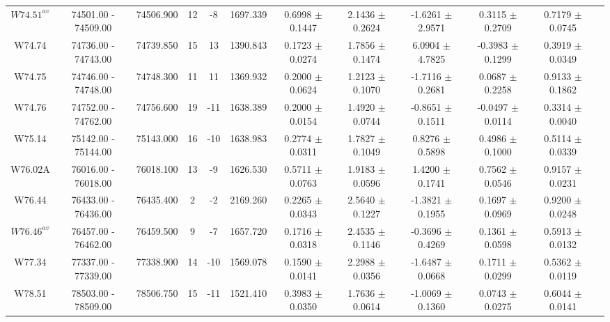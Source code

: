 \documentclass{article}
\begin{document}
\begin{table}[h]
{\begin{tabular}{|c|c|c|c|c|c|c|c|c|c|c|c|}
$W74.51^{av}$ & 74501.00 - 74509.00 & 74506.900 & 12 & -8 & 1697.339 & 0.6998 $\pm$ 0.1447 & 2.1436 $\pm$ 0.2624 & -1.6261 $\pm$ 2.9571 & 0.3115 $\pm$ 0.2709 & 0.7179 $\pm$ 0.0745 \\

W74.74 & 74736.00 - 74743.00 & 74739.850 & 15 & 13 & 1390.843 & 0.1723 $\pm$ 0.0274 & 1.7856 $\pm$ 0.1474 &  6.0904 $\pm$ 4.7825 & -0.3983 $\pm$ 0.1299 & 0.3919 $\pm$ 0.0349 \\

W74.75 & 74746.00 - 74748.00 & 74748.300 & 11 & 11 & 1369.932 & 0.2000 $\pm$ 0.0624 & 1.2123 $\pm$ 0.1070 & -1.7116 $\pm$ 0.2681 & 0.0687 $\pm$ 0.2258 & 0.9133 $\pm$ 0.1862 \\

W74.76 & 74752.00 - 74762.00 & 74756.600 & 19 & -11 & 1638.389 & 0.2000 $\pm$ 0.0154 & 1.4920 $\pm$ 0.0744 & -0.8651 $\pm$ 0.1511 & -0.0497 $\pm$ 0.0114 & 0.3314 $\pm$ 0.0040 \\
         
W75.14 & 75142.00 - 75144.00 & 75143.000 & 16 & -10 & 1638.983 & 0.2774 $\pm$ 0.0311 & 1.7827 $\pm$ 0.1049 &  0.8276 $\pm$ 0.5898 & 0.4986 $\pm$ 0.1000 & 0.5114 $\pm$ 0.0339 \\

W76.02A & 76016.00 - 76018.00 & 76018.100 & 13 & -9 & 1626.530 & 0.5711 $\pm$ 0.0763 & 1.9183 $\pm$ 0.0596 & 1.4200 $\pm$ 0.1741 & 0.7562 $\pm$ 0.0546 & 0.9157 $\pm$ 0.0231 \\

W76.44 & 76433.00 - 76436.00 & 76435.400 & 2 & -2 & 2169.260 & 0.2265 $\pm$ 0.0343 & 2.5640 $\pm$ 0.1227 & -1.3821 $\pm$ 0.1955 & 0.1697 $\pm$ 0.0969 & 0.9200 $\pm$ 0.0248 \\
    
$W76.46^{av}$ & 76457.00 - 76462.00 & 76459.500 & 9 & -7 & 1657.720 & 0.1716 $\pm$ 0.0318 & 2.4535 $\pm$ 0.1146 & -0.3696 $\pm$ 0.4269 & 0.1361 $\pm$ 0.0598 & 0.5913 $\pm$ 0.0132 \\
         
W77.34 & 77337.00 - 77339.00 & 77338.900 & 14 & -10 & 1569.078 & 0.1590 $\pm$ 0.0141 & 2.2988 $\pm$ 0.0356 & -1.6487 $\pm$ 0.0668 & 0.1711 $\pm$ 0.0299 & 0.5362 $\pm$ 0.0119 \\

W78.51 & 78503.00 - 78509.00 & 78506.750 & 15 & -11 & 1521.410 & 0.3983 $\pm$ 0.0350 & 1.7636 $\pm$ 0.0614 &  -1.0069 $\pm$ 0.1360 & 0.0743 $\pm$ 0.0275 & 0.6044 $\pm$ 0.0141 \\


\end{tabular}}
\end{table}
\end{document}
